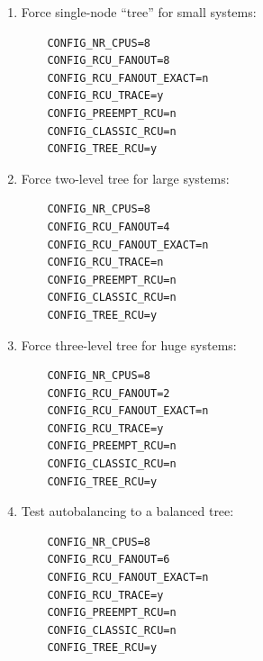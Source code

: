 \begin{enumerate}
\item	Force single-node ``tree'' for small systems:

\vspace{5pt}
\begin{minipage}[t]{\columnwidth}
\small
\begin{verbatim}
	CONFIG_NR_CPUS=8
	CONFIG_RCU_FANOUT=8
	CONFIG_RCU_FANOUT_EXACT=n
	CONFIG_RCU_TRACE=y
	CONFIG_PREEMPT_RCU=n
	CONFIG_CLASSIC_RCU=n
	CONFIG_TREE_RCU=y
\end{verbatim}
\end{minipage}
\vspace{5pt}

\item	Force two-level tree for large systems:

\vspace{5pt}
\begin{minipage}[t]{\columnwidth}
\small
\begin{verbatim}
	CONFIG_NR_CPUS=8
	CONFIG_RCU_FANOUT=4
	CONFIG_RCU_FANOUT_EXACT=n
	CONFIG_RCU_TRACE=n
	CONFIG_PREEMPT_RCU=n
	CONFIG_CLASSIC_RCU=n
	CONFIG_TREE_RCU=y
\end{verbatim}
\end{minipage}
\vspace{5pt}

\item	Force three-level tree for huge systems:

\vspace{5pt}
\begin{minipage}[t]{\columnwidth}
\small
\begin{verbatim}
	CONFIG_NR_CPUS=8
	CONFIG_RCU_FANOUT=2
	CONFIG_RCU_FANOUT_EXACT=n
	CONFIG_RCU_TRACE=y
	CONFIG_PREEMPT_RCU=n
	CONFIG_CLASSIC_RCU=n
	CONFIG_TREE_RCU=y
\end{verbatim}
\end{minipage}
\vspace{5pt}

\item	Test autobalancing to a balanced tree:

\vspace{5pt}
\begin{minipage}[t]{\columnwidth}
\small
\begin{verbatim}
	CONFIG_NR_CPUS=8
	CONFIG_RCU_FANOUT=6
	CONFIG_RCU_FANOUT_EXACT=n
	CONFIG_RCU_TRACE=y
	CONFIG_PREEMPT_RCU=n
	CONFIG_CLASSIC_RCU=n
	CONFIG_TREE_RCU=y
\end{verbatim}
\end{minipage}
\vspace{5pt}


\end{enumerate}
